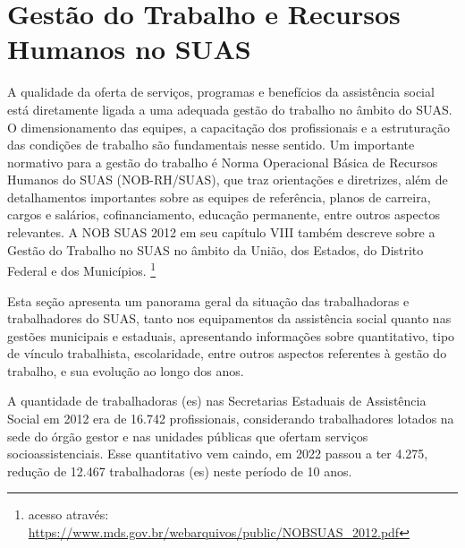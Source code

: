 \documentclass[
  brazilian]{report}
\begin{document}
\hypertarget{gestuxe3o-do-trabalho-e-recursos-humanos-no-suas}{%
\chapter{Gestão do Trabalho e Recursos Humanos no
SUAS}\label{gestuxe3o-do-trabalho-e-recursos-humanos-no-suas}}

A qualidade da oferta de serviços, programas e benefícios da assistência
social está diretamente ligada a uma adequada gestão do trabalho no
âmbito do SUAS. O dimensionamento das equipes, a capacitação dos
profissionais e a estruturação das condições de trabalho são
fundamentais nesse sentido. Um importante normativo para a gestão do
trabalho é Norma Operacional Básica de Recursos Humanos do SUAS
(NOB-RH/SUAS), que traz orientações e diretrizes, além de detalhamentos
importantes sobre as equipes de referência, planos de carreira, cargos e
salários, cofinanciamento, educação permanente, entre outros aspectos
relevantes. A NOB SUAS 2012 em seu capítulo VIII também descreve sobre a
Gestão do Trabalho no SUAS no âmbito da União, dos Estados, do Distrito
Federal e dos Municípios.
\footnote{acesso através:\url{ https://www.mds.gov.br/webarquivos/public/NOBSUAS_2012.pdf}}

Esta seção apresenta um panorama geral da situação das trabalhadoras e
trabalhadores do SUAS, tanto nos equipamentos da assistência social
quanto nas gestões municipais e estaduais, apresentando informações
sobre quantitativo, tipo de vínculo trabalhista, escolaridade, entre
outros aspectos referentes à gestão do trabalho, e sua evolução ao longo
dos anos.

A quantidade de trabalhadoras (es) nas Secretarias Estaduais de
Assistência Social em 2012 era de 16.742 profissionais, considerando
trabalhadores lotados na sede do órgão gestor e nas unidades públicas
que ofertam serviços socioassistenciais. Esse quantitativo vem caindo,
em 2022 passou a ter 4.275, redução de 12.467 trabalhadoras (es) neste
período de 10 anos.
\end{document}
